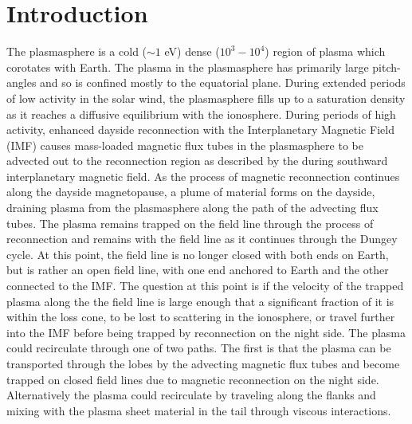 \documentclass[utf8]{frontiersinFPHY_FAMS}
\begin{document}
\section{Introduction}

The plasmasphere is a cold ($\sim1$ eV) dense ($10^{3}-10^{4}$) region of plasma which corotates with Earth. The plasma in the plasmasphere has primarily large pitch-angles and so is confined mostly to the equatorial plane. During extended periods of low activity in the solar wind, the plasmasphere fills up to a saturation density as it reaches a diffusive equilibrium with the ionosphere. During periods of high activity, enhanced dayside reconnection with the Interplanetary Magnetic Field (IMF) causes mass-loaded magnetic flux tubes in the plasmasphere to be advected out to the reconnection region as described by the \citet[Dungey(1961)]{dungey1961interplanetary} during southward interplanetary magnetic field. %
As the process of magnetic reconnection continues along the dayside magnetopause, a plume of material forms on the dayside, draining plasma from the plasmasphere along the path of the advecting  %
 flux tubes. The plasma remains trapped on the field line through the process of reconnection and remains with the field line as it continues through the Dungey cycle. At this point, the field line is no longer closed with both ends on Earth, but is rather an open field line, with one end anchored to Earth and the other connected to the IMF. The question at this point is if the velocity of the trapped plasma along the the field line is large enough that a significant fraction of it is within the loss cone, to be lost to scattering in the ionosphere, or travel further into the IMF before being trapped by reconnection on the night side. The plasma could recirculate through one of two paths.  The first is that the plasma can be transported through the lobes by the advecting magnetic flux tubes and become trapped on closed field lines due to magnetic reconnection on the night side. Alternatively the plasma could recirculate by traveling along the flanks and mixing with the plasma sheet material in the tail through viscous interactions. 
\end{document}
